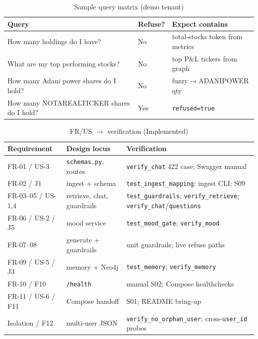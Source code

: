 \begin{table}[!htbp]
\centering
\small
\caption{Sample query matrix (demo tenant)}
\label{tab:sample-queries}
\begin{tabularx}{\textwidth}{@{}
  >{\raggedright\arraybackslash}X
  >{\centering\arraybackslash}p{}
  >{\raggedright\arraybackslash}p{}
  @{}}
\toprule
\textbf{Query} & \textbf{Refuse?} & \textbf{Expect contains} \\
\midrule
How many holdings do I have? & No & total-stocks token from metrics \\
\addlinespace
What are my top performing stocks? & No & top P\&L tickers from graph \\
\addlinespace
How many Adani power shares do I hold? & No & fuzzy$\rightarrow$ADANIPOWER qty \\
\addlinespace
How many NOTAREALTICKER shares do I hold? & Yes & \texttt{refused=true} \\
\bottomrule
\end{tabularx}
\end{table}

\begin{table}[!htbp]
\centering
\small
\caption{FR/US $\rightarrow$ verification (Implemented)}
\label{tab:trace-full}
\begin{tabularx}{\textwidth}{@{}
  >{\raggedright\arraybackslash}p{}
  >{\raggedright\arraybackslash}p{}
  >{\raggedright\arraybackslash}X
  @{}}
\toprule
\textbf{Requirement} & \textbf{Design locus} & \textbf{Verification} \\
\midrule
FR-01 / US-3 & \texttt{schemas.py}, routes & \texttt{verify\_chat} 422 case; Swagger manual \\
\addlinespace
FR-02 / J1 & ingest + schema & \texttt{test\_ingest\_mapping}; ingest CLI; S09 \\
\addlinespace
FR-03--05 / US-1,4 & retrieve, chat, guardrails & \texttt{test\_guardrails}; \texttt{verify\_retrieve}; \texttt{verify\_chat}/\texttt{questions} \\
\addlinespace
FR-06 / US-2 / J5 & mood service & \texttt{test\_mood\_gate}; \texttt{verify\_mood} \\
\addlinespace
FR-07--08 & generate + guardrails & unit guardrails; live refuse paths \\
\addlinespace
FR-09 / US-5 / J3 & memory + Neo4j & \texttt{test\_memory}; \texttt{verify\_memory} \\
\addlinespace
FR-10 / F10 & \texttt{/health} & manual S02; Compose healthchecks \\
\addlinespace
FR-11 / US-6 / F11 & Compose handoff & S01; README bring-up \\
\addlinespace
Isolation / F12 & multi-user JSON & \texttt{verify\_no\_orphan\_user}; cross-\texttt{user\_id} probes \\
\bottomrule
\end{tabularx}
\end{table}

